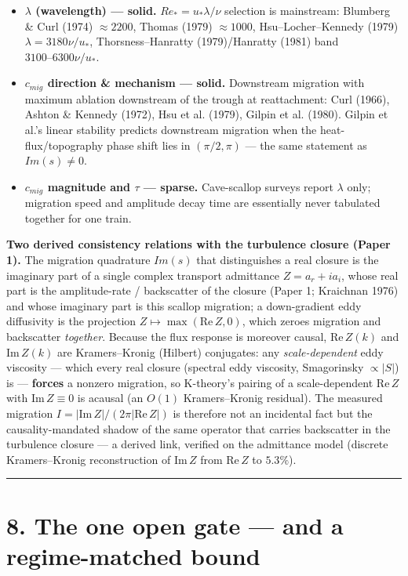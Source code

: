 \documentclass{jfm}
\begin{document}
\begin{itemize}
\item \textbf{$\lambda $ (wavelength) — solid.} $Re_*=u_*\lambda /\nu $ selection is mainstream: Blumberg \& Curl (1974) $\approx 2200$, Thomas (1979) $\approx 1000$, Hsu–Locher–Kennedy (1979) $\lambda =3180 \nu /u_*$, Thorsness–Hanratty (1979)/Hanratty (1981) band $3100–6300 \nu /u_*$.
\item \textbf{$c_{mig}$ direction \& mechanism — solid.} Downstream migration with maximum ablation downstream of the trough at reattachment: Curl (1966), Ashton \& Kennedy (1972), Hsu et al. (1979), Gilpin et al. (1980). Gilpin et al.'s linear stability predicts downstream migration when the heat-flux/topography phase shift lies in $(\pi /2, \pi )$ — the same statement as $Im(s)\ne 0$.
\item \textbf{$c_{mig}$ magnitude and $\tau $ — sparse.} Cave-scallop surveys report $\lambda $ only; migration speed and amplitude decay time are essentially never tabulated together for one train.
\end{itemize}


\textbf{Two derived consistency relations with the turbulence closure (Paper 1).} The migration quadrature $Im(s)$ that distinguishes a real closure is the imaginary part of a single complex transport admittance $Z=a_{r}+ia_{i}$, whose real part is the amplitude-rate / backscatter of the closure (Paper 1; Kraichnan 1976) and whose imaginary part is this scallop migration; a down-gradient eddy diffusivity is the projection $Z\mapsto \max(\mathrm{Re}\,Z,0)$, which zeroes migration and backscatter \emph{together}. Because the flux response is moreover causal, $\mathrm{Re}\,Z(k)$ and $\mathrm{Im}\,Z(k)$ are Kramers--Kronig (Hilbert) conjugates: any \emph{scale-dependent} eddy viscosity --- which every real closure (spectral eddy viscosity, Smagorinsky $\propto |S|$) is --- \textbf{forces} a nonzero migration, so K-theory's pairing of a scale-dependent $\mathrm{Re}\,Z$ with $\mathrm{Im}\,Z\equiv 0$ is acausal (an $O(1)$ Kramers--Kronig residual). The measured migration $I=|\mathrm{Im}\,Z|/(2\pi |\mathrm{Re}\,Z|)$ is therefore not an incidental fact but the causality-mandated shadow of the same operator that carries backscatter in the turbulence closure --- a derived link, verified on the admittance model (discrete Kramers--Kronig reconstruction of $\mathrm{Im}\,Z$ from $\mathrm{Re}\,Z$ to $5.3\%$).


\medskip\hrule\medskip


\section*{8. The one open gate — and a regime-matched bound}
\end{document}
